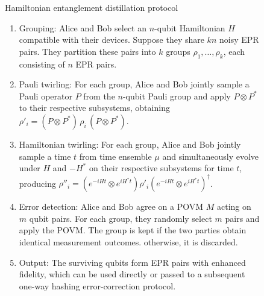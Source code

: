 \documentclass[onecolumn,prx,longbibliography,nofootinbib, superscriptaddress]{revtex4-2}
\theoremstyle{recap}
\begin{document}
\begin{figure}[htbp]
\begin{mybox}[label={box:HEDP}]{Hamiltonian entanglement distillation protocol}
\begin{enumerate}[label=(\arabic*)]
    \item {Grouping:}  
    Alice and Bob select an $n$-qubit Hamiltonian $H$ compatible with their devices. 
    Suppose they share $k n$ noisy EPR pairs. They partition these pairs into $k$ groups 
    $\rho_1, \ldots, \rho_k$, each consisting of $n$ EPR pairs.
    \item {Pauli twirling:}  
    For each group, Alice and Bob jointly sample a Pauli operator $P$ from the $n$-qubit Pauli group and apply $P \otimes P^{*}$ to their respective subsystems, obtaining $\rho'_i = (P \otimes P^{*}) \, \rho_i \, (P \otimes P^{*})$.
    \item Hamiltonian twirling: For each group, Alice and Bob jointly sample a time $t$ from time ensemble $\mu$ and simultaneously evolve under $H$ and $-H^*$ on their respective subsystems for time $t$, producing $\rho''_i = (e^{-iHt} \otimes e^{iH^*t})\rho'_i(e^{-iHt} \otimes e^{iH^*t})^{\dagger}$.
    \item {Error detection:}  
    Alice and Bob agree on a POVM $M$ acting on $m$ qubit pairs. For each group, they randomly select $m$ pairs and apply the POVM. The group is kept if the two parties obtain identical measurement outcomes. otherwise, it is discarded.
    \item {Output:}  
    The surviving qubits form EPR pairs with enhanced fidelity, which can be used directly 
    or passed to a subsequent one-way hashing error-correction protocol.
\end{enumerate}
\end{mybox}
\end{figure}
\end{document}
